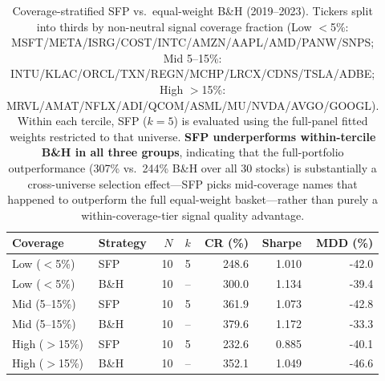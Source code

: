 \begin{table}[htbp]
\centering
\caption{Coverage-stratified SFP vs.\ equal-weight B\&H (2019--2023). Tickers split into thirds by non-neutral signal coverage fraction (Low $<$5\%: MSFT/META/ISRG/COST/INTC/AMZN/AAPL/AMD/PANW/SNPS; Mid 5--15\%: INTU/KLAC/ORCL/TXN/REGN/MCHP/LRCX/CDNS/TSLA/ADBE; High $>$15\%: MRVL/AMAT/NFLX/ADI/QCOM/ASML/MU/NVDA/AVGO/GOOGL). Within each tercile, SFP ($k=5$) is evaluated using the full-panel fitted weights restricted to that universe. \textbf{SFP underperforms within-tercile B\&H in all three groups}, indicating that the full-portfolio outperformance (307\% vs.\ 244\% B\&H over all 30 stocks) is substantially a cross-universe selection effect---SFP picks mid-coverage names that happened to outperform the full equal-weight basket---rather than purely a within-coverage-tier signal quality advantage.}
\label{tab:coverage_stratified}
\begin{tabular}{llrrrrr}
\toprule
\textbf{Coverage} & \textbf{Strategy} & \textbf{$N$} & \textbf{$k$} & \textbf{CR (\%)} & \textbf{Sharpe} & \textbf{MDD (\%)} \\
\midrule
Low ($<$5\%) & SFP & 10 & 5 & 248.6 & 1.010 & -42.0 \\
Low ($<$5\%) & B\&H & 10 & -- & 300.0 & 1.134 & -39.4 \\
\midrule
Mid (5--15\%) & SFP & 10 & 5 & 361.9 & 1.073 & -42.8 \\
Mid (5--15\%) & B\&H & 10 & -- & 379.6 & 1.172 & -33.3 \\
\midrule
High ($>$15\%) & SFP & 10 & 5 & 232.6 & 0.885 & -40.1 \\
High ($>$15\%) & B\&H & 10 & -- & 352.1 & 1.049 & -46.6 \\
\bottomrule
\end{tabular}
\end{table}
